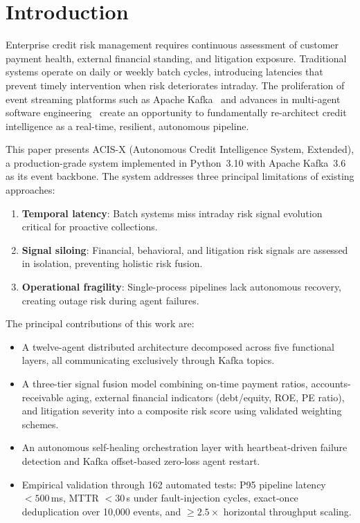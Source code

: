 \documentclass[runningheads]{llncs}
\begin{document}

\section{Introduction}
\label{sec:intro}

Enterprise credit risk management requires continuous assessment of customer payment health, external financial standing, and litigation exposure. Traditional systems operate on daily or weekly batch cycles, introducing latencies that prevent timely intervention when risk deteriorates intraday. The proliferation of event streaming platforms such as Apache Kafka~\cite{kreps2011kafka} and advances in multi-agent software engineering~\cite{zhang2024event} create an opportunity to fundamentally re-architect credit intelligence as a real-time, resilient, autonomous pipeline.

This paper presents ACIS-X (Autonomous Credit Intelligence System, Extended), a production-grade system implemented in Python~3.10 with Apache Kafka~3.6 as its event backbone. The system addresses three principal limitations of existing approaches:

\begin{enumerate}
    \item \textbf{Temporal latency}: Batch systems miss intraday risk signal evolution critical for proactive collections.
    \item \textbf{Signal siloing}: Financial, behavioral, and litigation risk signals are assessed in isolation, preventing holistic risk fusion.
    \item \textbf{Operational fragility}: Single-process pipelines lack autonomous recovery, creating outage risk during agent failures.
\end{enumerate}

The principal contributions of this work are:
\begin{itemize}
    \item A twelve-agent distributed architecture decomposed across five functional layers, all communicating exclusively through Kafka topics.
    \item A three-tier signal fusion model combining on-time payment ratios, accounts-receivable aging, external financial indicators (debt/equity, ROE, PE ratio), and litigation severity into a composite risk score using validated weighting schemes.
    \item An autonomous self-healing orchestration layer with heartbeat-driven failure detection and Kafka offset-based zero-loss agent restart.
    \item Empirical validation through 162 automated tests: P95 pipeline latency $<500$\,ms, MTTR $<30$\,s under fault-injection cycles, exact-once deduplication over 10,000 events, and $\geq2.5\times$ horizontal throughput scaling.
\end{itemize}
\end{document}
